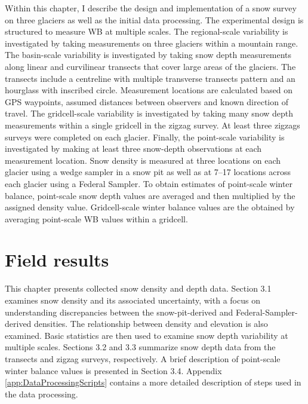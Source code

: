 \documentclass{sfuthesis}
\begin{document}
{Within this chapter, I describe the design and implementation of a snow survey on three glaciers as well as the initial data processing. The experimental design is structured to measure WB at multiple scales. The regional-scale variability is investigated by taking measurements on three glaciers within a mountain range. The basin-scale variability is investigated by taking snow depth measurements along linear and curvilinear transects that cover large areas of the glaciers. The transects include a centreline with multiple transverse transects pattern and an hourglass with inscribed circle. Measurement locations are calculated based on GPS waypoints, assumed distances between observers and known direction of travel. The gridcell-scale variability is investigated by taking many snow depth measurements within a single gridcell in the zigzag survey. At least three zigzags surveys were completed on each glacier. Finally, the point-scale variability is investigated by making at least three snow-depth observations at each measurement location. Snow density is measured at three locations on each glacier using a wedge sampler in a snow pit as well as at 7--17 locations across each glacier using a Federal Sampler. To obtain estimates of point-scale winter balance, point-scale snow depth values are averaged and then multiplied by the assigned density value. Gridcell-scale winter balance values are the obtained by averaging point-scale WB values within a gridcell. 




\chapter{Field results}

This chapter presents collected snow density and depth data. Section 3.1 examines snow density and its associated uncertainty, with a focus on understanding discrepancies between the snow-pit-derived and Federal-Sampler-derived densities. The relationship between density and elevation is also examined. Basic statistics are then used to examine snow depth variability at multiple scales. Sections 3.2 and 3.3 summarize snow depth data from the transects and zigzag surveys, respectively. A brief description of point-scale winter balance values is presented in Section 3.4. Appendix \ref{app:DataProcessingScripts} contains a more detailed description of steps used in the data processing.


}
\end{document}
